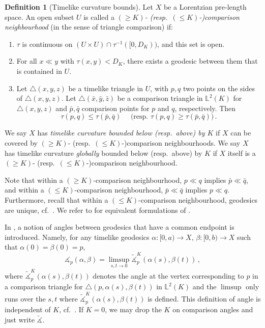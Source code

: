 \documentclass[11pt,reqno]{amsart}
\theoremstyle{definition}
\newcommand{\Cref}[1]{\zcref[S]{#1}}
\theoremstyle{definition}
\newtheorem{dfn}{Definition}[section]
\theoremstyle{plain}
\theoremstyle{remark}
\newcommand{\LpLSn}{Lorentzian pre-length space}
\newcommand{\ma}{\measuredangle}
\newcommand{\tma}{\widetilde \measuredangle}
\newcommand{\lm}[1]{\mathbb{L}^2(#1)}
\begin{document}
\begin{dfn}[Timelike curvature bounds]
\label{def: triangle comparison}
Let $X$ be a \LpLSn. An open subset $U$ is called a \emph{$(\geq K)$- (resp.\ $(\leq K)$-)comparison neighbourhood} (in the sense of triangle comparison) if:
\begin{enumerate}[label=(\roman*)]
\item $\tau$ is continuous on $(U\times U) \cap \tau^{-1}([0,D_K))$, and this set is open. 
\item For all $x \ll y$ with $\tau(x,y) < D_K$, there exists a geodesic between them that is contained in $U$.
\item \label{TLCB.item3} Let $\triangle (x,y,z)$ be a timelike triangle in $U$, with $p,q$ two points on the sides of $\triangle (x,y,z)$. Let $\triangle(\bar{x}, \bar{y}, \bar{z})$ be a comparison triangle in $\lm{K}$ for $\triangle (x,y,z)$ and $\bar{p},\bar{q}$ comparison points for $p$ and $q$, respectively. Then 
\begin{equation}
\label{eq: timelike triangle comparison inequality}
\tau(p,q) \leq \tau(\bar{p},\bar{q}) \quad \text{ (resp.\ } \tau(p,q) \geq \tau(\bar{p}, \bar{q}) \text{)} \, .
\end{equation}
\end{enumerate}
We say $X$ has \emph{timelike curvature bounded below (resp.\ above) by $K$} if $X$ can be covered by $(\geq K)$- (resp.\ $(\leq K)$-)comparison neighbourhoods. 
We say $X$ has timelike curvature \emph{globally} bounded below (resp.\ above) by $K$ if $X$ itself is a $(\geq K)$- (resp.\ $(\leq K)$-)comparison neighbourhood. 
\end{dfn}
Note that within a $(\geq K)$-comparison neighbourhood, $p \ll q$ implies $\bar{p} \ll \bar{q}$, and within a $(\leq K)$-comparison neighbourhood, $\bar{p} \ll \bar{q}$ implies $p \ll q$. 
Furthermore, recall that within a $(\leq K)$-comparison neighbourhood, geodesics are unique, cf.\ \cite[Theorem 4.7]{BNR25}. 
We refer to \cite{beran-kunzinger-rott2024} for equivalent formulations of \Cref{def: triangle comparison}. 

In \cite{beran-saemann2023}, a notion of angles between geodesics that have a common endpoint is introduced. 
Namely, for any timelike geodesics $\alpha\colon [0,a)\to X$, $\beta\colon [0,b)\to X$ such that $\alpha(0)=\beta(0)=p$, 
\begin{equation}
\label{eq:angle between curves}
\ma_p(\alpha,\beta) = \limsup_{s,t\to 0} \widetilde{\ma}^K_p(\alpha(s),\beta(t)) \, ,
\end{equation}
where $\widetilde{\ma}^K_p(\alpha(s),\beta(t))$ denotes the angle at the vertex corresponding to $p$ in a comparison triangle for $\triangle(p,\alpha(s),\beta(t))$ in $\mathbb{L}^2(K)$ and the $\limsup$ only runs over the $s,t$ where $\widetilde{\ma}^K_p(\alpha(s),\beta(t))$ is defined. 
This definition of angle is independent of $K$, cf.\ \cite[Proposition 2.14]{beran-saemann2023}. 
If $K=0$, we may drop the $K$ on comparison angles and just write $\tma$. 
\end{document}
